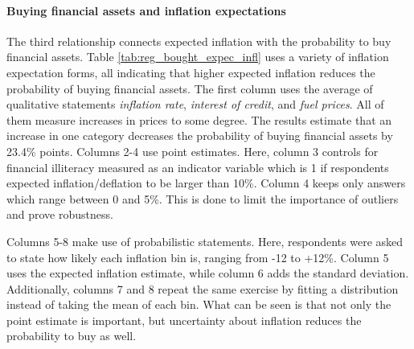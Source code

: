\documentclass[ProjectABM]{subfiles}
\begin{document}


\paragraph{Buying financial assets and inflation expectations}
The third relationship connects expected inflation with the probability to buy financial assets. %
Table \ref{tab:reg_bought_expec_infl} uses a variety of inflation expectation forms, all indicating that higher expected inflation reduces the probability of buying financial assets. The first column uses the average of qualitative statements \textit{inflation rate}, \textit{interest of credit}, and \textit{fuel prices}. All of them measure increases in prices to some degree. The results estimate that an increase in one category decreases the probability of buying financial assets by 23.4\% points. Columns 2-4 use point estimates. Here, column 3 controls for financial illiteracy measured as an indicator variable which is 1 if respondents expected inflation/deflation to be larger than 10\%. Column 4 keeps only answers which range between 0 and 5\%. This is done to limit the importance of outliers and prove robustness.

Columns 5-8 make use of probabilistic statements. Here, respondents were asked to state how likely each inflation bin is, ranging from -12 to +12\%. Column 5 uses the expected inflation estimate, while column 6 adds the standard deviation. Additionally, columns 7 and 8 repeat the same exercise by fitting a distribution instead of taking the mean of each bin. What can be seen is that not only the point estimate is important, but uncertainty about inflation reduces the probability to buy as well. %
\end{document}
